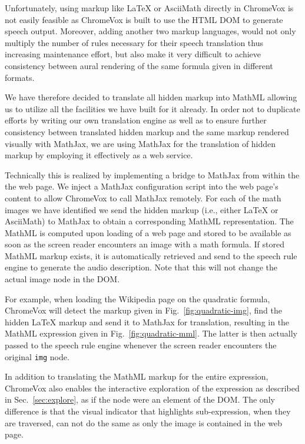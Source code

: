 \documentclass{sig-alternate}
\begin{document}
Unfortunately, using markup like {\LaTeX} or AsciiMath directly in ChromeVox is
not easily feasible as ChromeVox is built to use the HTML DOM to generate speech
output. Moreover, adding another two markup languages, would not only multiply
the number of rules necessary for their speech translation thus increasing
maintenance effort, but also make it very difficult to achieve consistency
between aural rendering of the same formula given in different formats.

We have therefore decided to translate all hidden markup into MathML allowing us
to utilize all the facilities we have built for it already. In order not to
duplicate efforts by writing our own translation engine as well as to ensure
further consistency between translated hidden markup and the same markup
rendered visually with MathJax, we are using MathJax for the translation of
hidden markup by employing it effectively as a web service.

Technically this is realized by implementing a bridge to MathJax from within the
the web page. We inject a MathJax configuration script into the web page's
content to allow ChromeVox to call MathJax remotely. For each of the math images
we have identified we send the hidden markup (i.e., either {\LaTeX} or
AsciiMath) to MathJax to obtain a corresponding MathML representation. The
MathML is computed upon loading of a web page and stored to be available as soon
as the screen reader encounters an image with a math formula. If stored MathML
markup exists, it is automatically retrieved and send to the speech rule engine
to generate the audio description. Note that this will not change the actual
image node in the DOM.

For example, when loading the Wikipedia page on the quadratic formula, ChromeVox
will detect the markup given in Fig.~\ref{fig:quadratic-img}, find the hidden
{\LaTeX} markup and send it to MathJax for translation, resulting in the MathML
expression given in Fig.~\ref{fig:quadratic-mml}. The latter is then actually
passed to the speech rule engine whenever the screen reader encounters the
original \texttt{img} node.

In addition to translating the MathML markup for the entire expression,
ChromeVox also enables the interactive exploration of the expression as
described in Sec.~\ref{sec:explore}, as if the node were an element of the
DOM. The only difference is that the visual indicator that highlights
sub-expression, when they are traversed, can not do the same as only the image is
contained in the web page.
\end{document}

